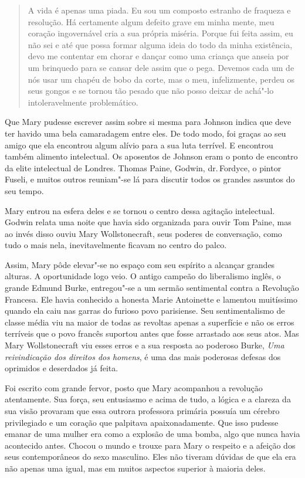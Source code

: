 \begin{quote}
A vida é apenas uma piada. Eu sou um composto estranho de fraqueza e
resolução. Há certamente algum defeito grave em minha mente, meu coração
ingovernável cria a sua própria miséria. Porque fui feita assim, eu não
sei e até que possa formar alguma ideia do todo da minha existência,
devo me contentar em chorar e dançar como uma criança que anseia por um
brinquedo para se cansar dele assim que o pega. Devemos cada um de nós
usar um chapéu de bobo da corte, mas o meu, infelizmente, perdeu os seus
gongos e se tornou tão pesado que não posso deixar de achá"-lo
intoleravelmente problemático.
\end{quote}

Que Mary pudesse escrever assim sobre si mesma para Johnson indica que
deve ter havido uma bela camaradagem entre eles. De todo modo, foi
graças ao seu amigo que ela encontrou algum alívio para a sua luta
terrível. E encontrou também alimento intelectual. Os aposentos de
Johnson eram o ponto de encontro da elite intelectual de Londres. Thomas
Paine, Godwin, dr.\,Fordyce, o pintor Fuseli, e muitos outros reuniam"-se
lá para discutir todos os grandes assuntos do seu tempo.

Mary entrou na esfera deles e se tornou o centro dessa agitação
intelectual. Godwin relata uma noite que havia sido organizada para
ouvir Tom Paine, mas ao invés disso ouviu Mary Wollstonecraft, seus
poderes de conversação, como tudo o mais nela, inevitavelmente ficavam
no centro do palco.

Assim, Mary pôde elevar"-se no espaço com seu espírito a alcançar grandes
alturas. A oportunidade logo veio. O antigo campeão do liberalismo
inglês, o grande Edmund Burke, entregou"-se a um sermão sentimental
contra a Revolução Francesa. Ele havia conhecido a honesta Marie
Antoinette e lamentou muitíssimo quando ela caiu nas garras do furioso
povo parisiense. Seu sentimentalismo de classe média viu na maior de
todas as revoltas apenas a superfície e não os erros terríveis que o
povo francês suportou antes que fosse arrastado aos seus atos. Mas Mary
Wollstonecraft viu esses erros e a sua resposta ao poderoso Burke,
\emph{Uma reivindicação dos direitos dos homens}, é uma das mais
poderosas defesas dos oprimidos e deserdados já feita.

Foi escrito com grande fervor, posto que Mary acompanhou a revolução atentamente.
Sua força, seu entusiasmo e acima de tudo, a lógica e a clareza da sua
visão provaram que essa outrora professora primária possuía um cérebro
privilegiado e um coração que palpitava apaixonadamente. Que isso
pudesse emanar de uma mulher era como a explosão de uma bomba, algo que
nunca havia acontecido antes. Chocou o mundo e trouxe para Mary o
respeito e a afeição dos seus contemporâneos do sexo masculino. Eles não
tiveram dúvidas de que ela era não apenas uma igual, mas em muitos
aspectos superior à maioria deles.

